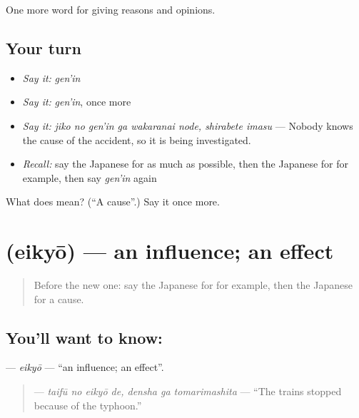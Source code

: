 \begin{grammarlens}[title={What you've built}]
One more word for giving reasons and opinions.
\end{grammarlens}

\subsection*{Your turn}
\begin{itemize}
\raggedright
  \item \emph{Say it:} \emph{gen'in}
  \item \emph{Say it:} \emph{gen'in}, once more
  \item \emph{Say it:} \emph{jiko no gen'in ga wakaranai node, shirabete imasu} — Nobody knows the cause of the accident, so it is being investigated.
  \item \emph{Recall:} say the Japanese for as much as possible, then the Japanese for for example, then say \emph{gen'in} again
\end{itemize}

\begin{tcolorbox}[breakable,colback=teal!4,colframe=teal!35!black,title={Before you move on}]
What does  mean? (\textquotedblleft{}A cause\textquotedblright{}.) Say it once more.
\end{tcolorbox}
\section[\texorpdfstring{\ja{えいきょう} (eikyō)}{えいきょう (eikyō)}]{ (eikyō) — an influence; an effect}

\label{lesson:JA-C342-eikyou}



\begin{quote}
Before the new one: say the Japanese for for example, then the Japanese for a cause.
\end{quote}

\subsection*{You'll want to know: }
\textbf{} — \emph{eikyō} — \textquotedblleft{}an influence; an effect\textquotedblright{}.

\begin{quote}
\textbf{  } — \emph{taifū no eikyō de, densha ga tomarimashita} — \textquotedblleft{}The trains stopped because of the typhoon.\textquotedblright{}
\end{quote}

